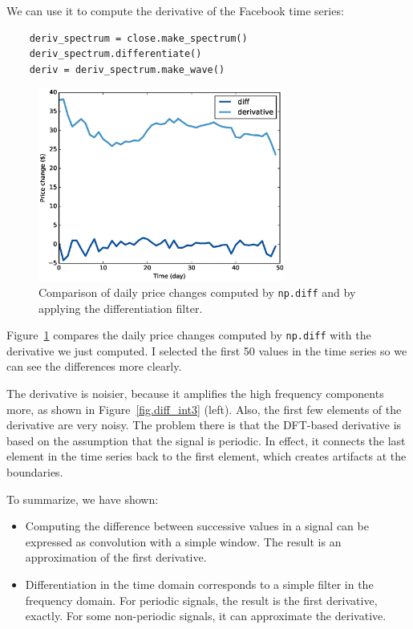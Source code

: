 \documentclass[12pt]{book}
\begin{document}
We can use it to compute the derivative of the Facebook time series:

\begin{verbatim}
    deriv_spectrum = close.make_spectrum()
    deriv_spectrum.differentiate()
    deriv = deriv_spectrum.make_wave()
\end{verbatim}

\begin{figure}
\centerline{\includegraphics[height=2.5in]{figs/diff_int4.eps}}
\caption{Comparison of daily price changes computed by
{\tt np.diff} and by applying the differentiation filter.}
\label{fig.diff_int4}
\end{figure}

Figure~\ref{fig.diff_int4} compares the daily price changes computed by
{\tt np.diff} with the derivative we just computed.
I selected the first 50 values in the time series so we can see the
differences more clearly.

The derivative is noisier, because it amplifies the high frequency
components more, as shown in Figure~\ref{fig.diff_int3} (left).  Also, the
first few elements of the derivative are very noisy.  The problem
there is that the DFT-based derivative is based on the assumption that
the signal is periodic.  In effect, it connects the last element in
the time series back to the first element, which creates artifacts at
the boundaries.

To summarize, we have shown:

\begin{itemize} 

\item Computing the difference between successive values in a signal
  can be expressed as convolution with a simple window.  The result is
  an approximation of the first derivative.

\item Differentiation in the time domain corresponds to a simple
  filter in the frequency domain.  For periodic signals, the result is
  the first derivative, exactly.  For some non-periodic signals, it
  can approximate the derivative.

\end{itemize}
\end{document}
